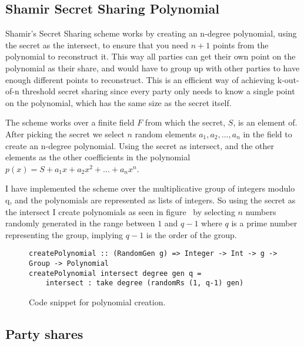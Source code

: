 \documentclass[a4paper,oneside,12pt,final]{article}
\begin{document}
\subsection{Shamir Secret Sharing Polynomial}

Shamir's Secret Sharing scheme works by creating an n-degree polynomial,
using the secret as the intersect, to ensure that you need $n+1$ points from the
polynomial to reconstruct it. This way all parties can get their own point on
the polynomial as their share, and would have to group up with other parties to
have enough different points to reconstruct. This is an efficient way of
achieving k-out-of-n threshold secret sharing since every party only needs to
know a single point on the polynomial, which has the same size as the secret
itself.

The scheme works over a finite field $F$ from which the secret, $S$, is an
element of. After picking the secret we select $n$ random elements $a_1, a_2,
..., a_n$ in the field to create an n-degree polynomial. Using the secret as
intersect, and the other elements as the other coefficients in the polynomial
$p(x) = S + a_1x + a_2x^2 + ... + a_nx^n$.

I have implemented the scheme over the multiplicative group of integers modulo
q, and the polynomials are represented
as lists of integers. So using the secret as the intersect I create polynomials
as seen in figure~\pageref{fig:create-polynomial} by selecting $n$ numbers
randomly generated in the range between $1$ and $q-1$ where $q$ is a prime
number representing the group, implying $q-1$ is the order of the group.
\footnotemark

\newpage

\begin{figure}[h]
\label{fig:create-polynomial}
\begin{verbatim}
createPolynomial :: (RandomGen g) => Integer -> Int -> g -> Group -> Polynomial
createPolynomial intersect degree gen q =
    intersect : take degree (randomRs (1, q-1) gen)
\end{verbatim}
\caption{Code snippet for polynomial creation.}
\end{figure}


\subsection{Party shares}
\end{document}

